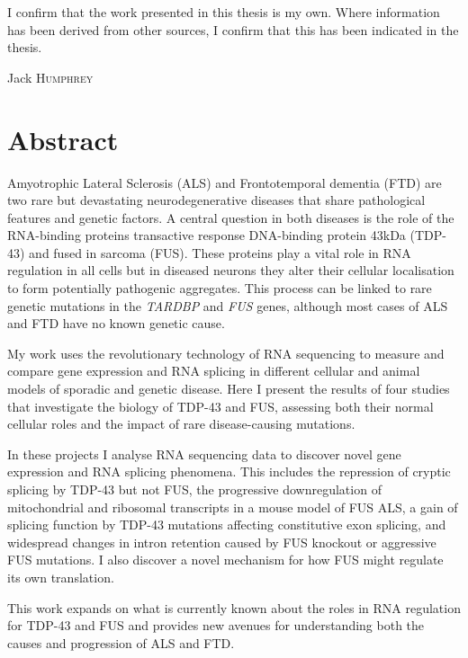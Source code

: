
I confirm that the work presented in this thesis is my own.  Where information has been derived from other sources, I confirm that this has been indicated in the thesis.

Jack \textsc{Humphrey}
\vfill


\cleardoublepage


\vfill
\section*{Abstract}
Amyotrophic Lateral Sclerosis (ALS) and Frontotemporal dementia (FTD) are two rare but devastating neurodegenerative diseases that share pathological features and genetic factors. 
A central question in both diseases is the role of the RNA-binding proteins transactive response DNA-binding protein 43kDa (TDP-43) and fused in sarcoma (FUS). 
These proteins play a vital role in RNA regulation in all cells but in diseased neurons they alter their cellular localisation to form potentially pathogenic aggregates. 
This process can be linked to rare genetic mutations in the \textit{TARDBP} and \textit{FUS} genes, although most cases of ALS and FTD have no known genetic cause. 

My work uses the revolutionary technology of RNA sequencing to measure and compare gene expression and RNA splicing in different cellular and animal models of sporadic and genetic disease.
Here I present the results of four studies that investigate the biology of TDP-43 and FUS, assessing both their normal cellular roles and the impact of rare disease-causing mutations.

In these projects I analyse RNA sequencing data to discover novel gene expression and RNA splicing phenomena.
This includes the repression of cryptic splicing by TDP-43 but not FUS, the progressive downregulation of mitochondrial and ribosomal transcripts in a mouse model of FUS ALS, a gain of splicing function by TDP-43 mutations affecting constitutive exon splicing, and widespread changes in intron retention caused by FUS knockout or aggressive FUS mutations. I also discover a novel mechanism for how FUS might regulate its own translation.

This work expands on what is currently known about the roles in RNA regulation for TDP-43 and FUS and provides new avenues for understanding both the causes and progression of ALS and FTD.

